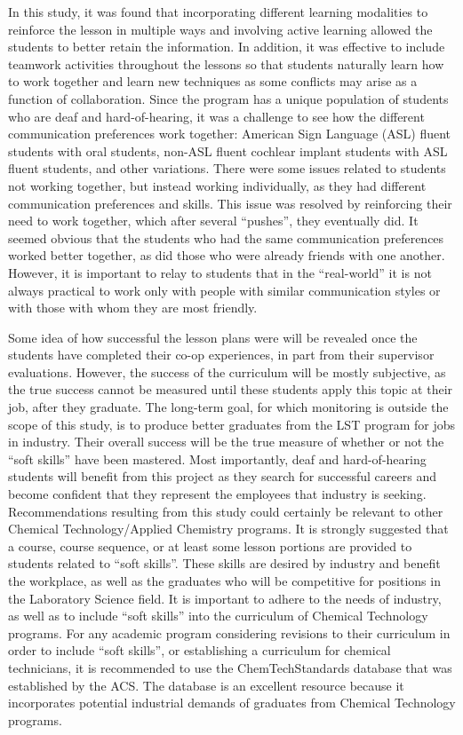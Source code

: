 \documentclass[11.5pt]{sig-alternate} %
\begin{document}
\begin{large}
In this study, it was found that incorporating different learning modalities to reinforce the lesson in multiple ways and involving active learning allowed the students to better retain the information. In addition, it was effective to include teamwork activities throughout the lessons so that students naturally learn how to work together and learn new techniques as some conflicts may arise as a function of collaboration. Since the program has a unique population of students who are deaf and hard-of-hearing, it was a challenge to see how the different communication preferences work together: American Sign Language (ASL) fluent students with oral students, non-ASL fluent cochlear implant students with ASL fluent students, and other variations. There were some issues related to students not working together, but instead working individually, as they had different communication preferences and skills. This issue was resolved by reinforcing their need to work together, which after several “pushes”, they eventually did. It seemed obvious that the students who had the same communication preferences worked better together, as did those who were already friends with one another. However, it is important to relay to students that in the “real-world” it is not always practical to work only with people with similar communication styles or with those with whom they are most friendly.

Some idea of how successful the lesson plans were will be revealed once the students have completed their co-op experiences, in part from their supervisor evaluations. However, the success of the curriculum will be mostly subjective, as the true success cannot be measured until these students apply this topic at their job, after they graduate. The long-term goal, for which monitoring is outside the scope of this study, is to produce better graduates from the LST program for jobs in industry. Their overall success will be the true measure of whether or not the “soft skills” have been mastered. Most importantly, deaf and hard-of-hearing students will benefit from this project as they search for successful careers and become confident that they represent the employees that industry is seeking. Recommendations resulting from this study could certainly be relevant to other Chemical Technology/Applied Chemistry programs. It is strongly suggested that a course, course sequence, or at least some lesson portions are provided to students related to “soft skills”. These skills are desired by industry and benefit the workplace, as well as the graduates who will be competitive for positions in the Laboratory Science field. It is important to adhere to the needs of industry, as well as to include “soft skills” into the curriculum of Chemical Technology programs. For any academic program considering revisions to their curriculum in order to include “soft skills”, or establishing a curriculum for chemical technicians, it is recommended to use the ChemTechStandards database that was established by the ACS. The database is an excellent resource because it incorporates potential industrial demands of graduates from Chemical Technology programs.


\end{large}
\end{document}
